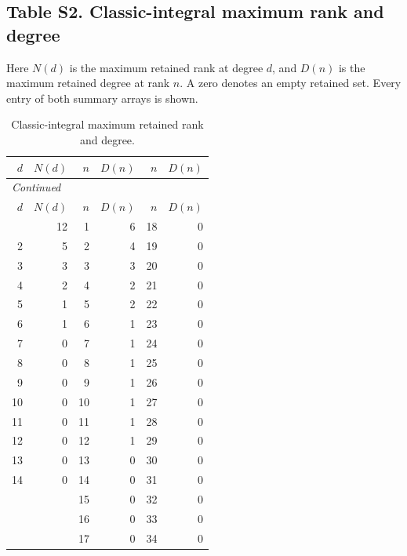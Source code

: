 \documentclass[12pt]{amsart}
\theoremstyle{remark}
\theoremstyle{definition}
\numberwithin{equation}{section}
\begin{document}
\clearpage
\subsection*{Table S2. Classic-integral maximum rank and degree}
Here $N(d)$ is the maximum retained rank at degree $d$, and $D(n)$ is the
maximum retained degree at rank $n$. A zero denotes an empty retained set.
Every entry of both summary arrays is shown.
\begingroup
\small
\begin{longtable}{rrrrrr}
\caption{Classic-integral maximum retained rank and degree.}\label{tab:s2}\\
\toprule
$d$ & $N(d)$ & $n$ & $D(n)$ & $n$ & $D(n)$ \\
\midrule
\endfirsthead
\multicolumn{6}{l}{\textit{Continued}}\\
\toprule
$d$ & $N(d)$ & $n$ & $D(n)$ & $n$ & $D(n)$ \\
\midrule
\endhead
\midrule
\endfoot
\bottomrule
\endlastfoot
1 & 12 & 1 & 6 & 18 & 0 \\
2 & 5 & 2 & 4 & 19 & 0 \\
3 & 3 & 3 & 3 & 20 & 0 \\
4 & 2 & 4 & 2 & 21 & 0 \\
5 & 1 & 5 & 2 & 22 & 0 \\
6 & 1 & 6 & 1 & 23 & 0 \\
7 & 0 & 7 & 1 & 24 & 0 \\
8 & 0 & 8 & 1 & 25 & 0 \\
9 & 0 & 9 & 1 & 26 & 0 \\
10 & 0 & 10 & 1 & 27 & 0 \\
11 & 0 & 11 & 1 & 28 & 0 \\
12 & 0 & 12 & 1 & 29 & 0 \\
13 & 0 & 13 & 0 & 30 & 0 \\
14 & 0 & 14 & 0 & 31 & 0 \\
 &  & 15 & 0 & 32 & 0 \\
 &  & 16 & 0 & 33 & 0 \\
 &  & 17 & 0 & 34 & 0 \\
\end{longtable}
\endgroup

\clearpage
\end{document}
